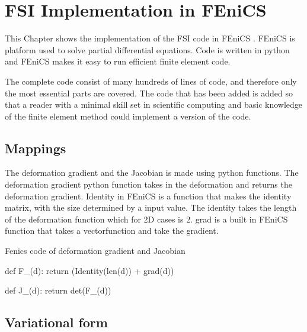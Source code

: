 \begin{comment}
\lstdefinelanguage{Python}{
 keywords={typeof, null, catch, switch, in, int, str, float, self},
 ndkeywords={boolean, throw, import},
 ndkeywords={return, class, if ,elif, endif, while, do, else, True, False , catch, def},
 ndkeywordstyle=\color{blue}\bfseries,
 identifierstyle=\color{black},
 sensitive=false,
 comment=[l]{\#},
 morecomment=[s]{/*}{*/},
 commentstyle=\color{purple}\ttfamily,
 stringstyle=\color{red}\ttfamily,
 backgroundcolor = \color{lightgray}
}
\end{comment}


\chapter{FSI Implementation in FEniCS}
This Chapter shows the implementation of the FSI code in FEniCS \cite{FENICS}. FEniCS is platform used to solve partial differential equations. Code is written in python and FEniCS makes it easy to run efficient finite element code. \newline

The complete code consist of many hundreds of lines of code, and therefore only the most essential parts are covered. The code that has been added is added so that a reader with a minimal skill set in scientific computing and basic knowledge of the finite element method could implement a version of the code.



\section{Mappings}
The deformation gradient and the Jacobian is made using python functions. The deformation gradient python function takes in the deformation and returns the deformation gradient. Identity in FEniCS is a function that makes the identity matrix, with the size determined by a input value. The identity takes the length of the deformation function which for 2D cases is 2. grad is a built in FEniCS function that takes a vectorfunction and take the gradient.
\begin{python}\caption{Fenics code of deformation gradient and Jacobian}
def F_(d):
	return (Identity(len(d)) + grad(d))

def J_(d):
	return det(F_(d))
\end{python}


\section{Variational form}

